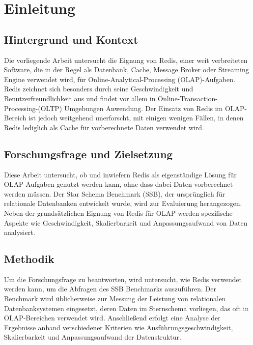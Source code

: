 \chapter{Einleitung}

\section{Hintergrund und Kontext}
Die vorliegende Arbeit untersucht die Eignung von Redis, einer weit verbreiteten Software, die in der Regel als Datenbank, Cache, Message Broker oder Streaming Engine verwendet wird, für Online-Analytical-Processing (OLAP)-Aufgaben. Redis zeichnet sich besonders durch seine Geschwindigkeit und Benutzerfreundlichkeit aus und findet vor allem in Online-Transaction-Processing-(OLTP) Umgebungen Anwendung. Der Einsatz von Redis im OLAP-Bereich ist jedoch weitgehend unerforscht, mit einigen wenigen Fällen, in denen Redis lediglich als Cache für vorberechnete Daten verwendet wird.

\section{Forschungsfrage und Zielsetzung}
Diese Arbeit untersucht, ob und inwiefern Redis als eigenständige Lösung für OLAP-Aufgaben genutzt werden kann, ohne dass dabei Daten vorberechnet werden müssen. Der Star Schema Benchmark (SSB), der ursprünglich für relationale Datenbanken entwickelt wurde, wird zur Evaluierung herangezogen. Neben der grundsätzlichen Eignung von Redis für OLAP werden spezifische Aspekte wie Geschwindigkeit, Skalierbarkeit und Anpassungsaufwand von Daten analysiert.

\section{Methodik}
Um die Forschungsfrage zu beantworten, wird untersucht, wie Redis verwendet werden kann, um die Abfragen des SSB Benchmarks auszuführen. Der Benchmark wird üblicherweise zur Messung der Leistung von relationalen Datenbanksystemen eingesetzt, deren Daten im Sternschema vorliegen, das oft in OLAP-Bereichen verwendet wird.
Anschließend erfolgt eine Analyse der Ergebnisse anhand verschiedener Kriterien wie Ausführungsgeschwindigkeit, Skalierbarkeit und Anpassungsaufwand der Datenstruktur.


